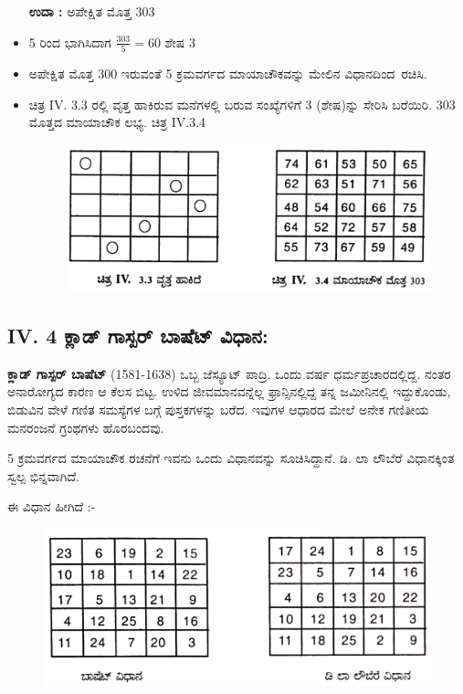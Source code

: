\begin{itemize}
	\textbf{ಉದಾ :} ಅಪೇಕ್ಷಿತ ಮೊತ್ತ 303\smallskip
	\item 5 ರಿಂದ ಭಾಗಿಸಿದಾಗ $\frac{303}{5}=60$ ಶೇಷ 3
	\item ಅಪೇಕ್ಷಿತ ಮೊತ್ತ 300 ಇರುವಂತೆ 5 ಕ್ರಮವರ್ಗದ ಮಾಯಾಚೌಕವನ್ನು ಮೇಲಿನ \hbox{ವಿಧಾನದಿಂದ ರಚಿಸಿ.}
	\item ಚಿತ್ರ IV. 3.3 ರಲ್ಲಿ ವೃತ್ತ ಹಾಕಿರುವ ಮನೆಗಳಲ್ಲಿ ಬರುವ ಸಂಖ್ಯೆಗಳಿಗೆ 3 (ಶೇಷ)ನ್ನು ಸೇರಿಸಿ ಬರೆಯಿರಿ. 303 ಮೊತ್ತದ ಮಾಯಾಚೌಕ ಲಭ್ಯ. ಚಿತ್ರ IV.3.4
	\begin{figure}[H]
	\includegraphics{src/figures/chap3/fig3-42.jpg}
	\end{figure}
\end{itemize}

\subsection*{IV. 4 ಕ್ಲಾಡ್ ಗಾಸ್ಪರ್ ಬಾಷೆಟ್ ವಿಧಾನ:}

\textbf{ಕ್ಲಾಡ್ ಗಾಸ್ಪರ್ ಬಾಷೆಟ್} (1581-1638) ಒಬ್ಬ ಜೆಸ್ಯೂಟ್ ಪಾದ್ರಿ. ಒಂದು ವರ್ಷ ಧರ್ಮ\-ಪ್ರಚಾರದಲ್ಲಿದ್ದ. ನಂತರ ಅನಾರೋಗ್ಯದ ಕಾರಣ ಆ ಕೆಲಸ ಬಿಟ್ಟ. ಉಳಿದ ಜೀವಮಾನವನ್ನೆಲ್ಲ ಫ್ರಾನ್ಸಿನಲ್ಲಿದ್ದ ತನ್ನ ಜಮೀನಿನಲ್ಲಿ ಇದ್ದುಕೊಂಡು, ಬಿಡುವಿನ ವೇಳೆ ಗಣಿತ ಸಮಸ್ಯೆಗಳ ಬಗ್ಗೆ \break ಪುಸ್ತಕಗಳನ್ನು ಬರೆದ. ಇವುಗಳ ಆಧಾರದ ಮೇಲೆ ಅನೇಕ ಗಣಿತೀಯ ಮನರಂಜನೆ ಗ್ರಂಥ\-ಗಳು ಹೊರಬಂದವು.

5 ಕ್ರಮವರ್ಗದ ಮಾಯಾಚೌಕ ರಚನೆಗೆ ಇವನು ಒಂದು ವಿಧಾನವನ್ನು ಸೂಚಿಸಿದ್ದಾನೆ. ಡಿ. ಲಾ ಲೌಬೆರೆ ವಿಧಾನಕ್ಕಿಂತ ಸ್ವಲ್ಪ ಭಿನ್ನವಾಗಿದೆ.

ಈ ವಿಧಾನ ಹೀಗಿದೆ :-
\begin{figure}[H]
\includegraphics{src/figures/chap3/fig3-43.jpg}
\end{figure}

